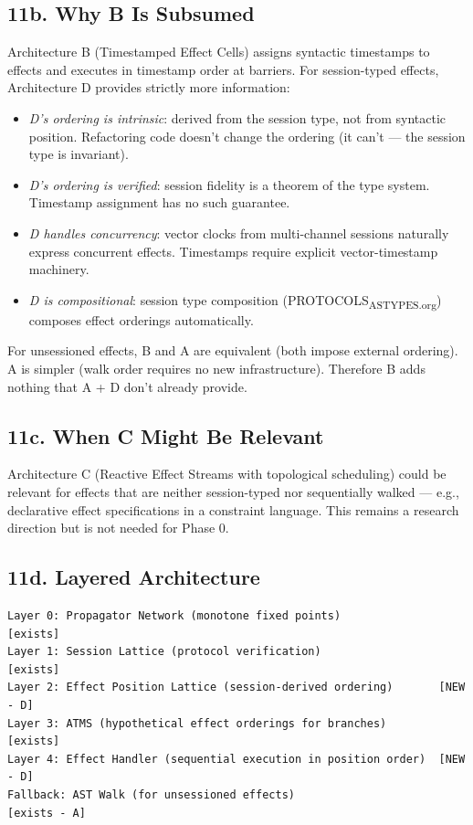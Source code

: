 \documentclass[11pt]{article}
\begin{document}
\subsection{11b. Why B Is Subsumed}
\label{sec:org918b3a6}

Architecture B (Timestamped Effect Cells) assigns syntactic timestamps to
effects and executes in timestamp order at barriers. For session-typed effects,
Architecture D provides strictly more information:

\begin{itemize}
\item \emph{D's ordering is intrinsic}: derived from the session type, not from
syntactic position. Refactoring code doesn't change the ordering (it can't
— the session type is invariant).
\item \emph{D's ordering is verified}: session fidelity is a theorem of the type
system. Timestamp assignment has no such guarantee.
\item \emph{D handles concurrency}: vector clocks from multi-channel sessions
naturally express concurrent effects. Timestamps require explicit
vector-timestamp machinery.
\item \emph{D is compositional}: session type composition (PROTOCOLS\textsubscript{AS}\textsubscript{TYPES.org})
composes effect orderings automatically.
\end{itemize}

For unsessioned effects, B and A are equivalent (both impose external ordering).
A is simpler (walk order requires no new infrastructure). Therefore B adds
nothing that A + D don't already provide.
\subsection{11c. When C Might Be Relevant}
\label{sec:org1768575}

Architecture C (Reactive Effect Streams with topological scheduling) could be
relevant for effects that are neither session-typed nor sequentially walked —
e.g., declarative effect specifications in a constraint language. This remains
a research direction but is not needed for Phase 0.
\subsection{11d. Layered Architecture}
\label{sec:orgc628968}

\begin{verbatim}
Layer 0: Propagator Network (monotone fixed points)               [exists]
Layer 1: Session Lattice (protocol verification)                  [exists]
Layer 2: Effect Position Lattice (session-derived ordering)       [NEW - D]
Layer 3: ATMS (hypothetical effect orderings for branches)        [exists]
Layer 4: Effect Handler (sequential execution in position order)  [NEW - D]
Fallback: AST Walk (for unsessioned effects)                      [exists - A]
\end{verbatim}
\end{document}
